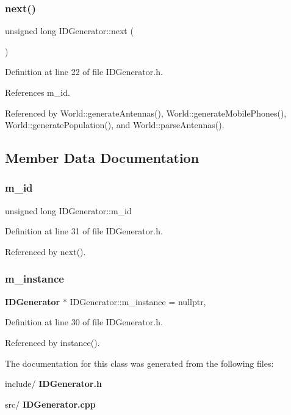 \mbox{\label{class_i_d_generator_a99d8cabb2ec6a17888a8ccbe9c85fee0}} 
\subsubsection{next()}
{\footnotesize\ttfamily unsigned long I\+D\+Generator\+::next (\begin{DoxyParamCaption}{ }\end{DoxyParamCaption})\hspace{0.3cm}{\ttfamily [inline]}}



Definition at line 22 of file I\+D\+Generator.\+h.



References m\+\_\+id.



Referenced by World\+::generate\+Antennas(), World\+::generate\+Mobile\+Phones(), World\+::generate\+Population(), and World\+::parse\+Antennas().



\subsection{Member Data Documentation}
\mbox{\label{class_i_d_generator_ad0400380525f694b23ff675f4f170893}} 
\subsubsection{m\_id}
{\footnotesize\ttfamily unsigned long I\+D\+Generator\+::m\+\_\+id\hspace{0.3cm}{\ttfamily [private]}}



Definition at line 31 of file I\+D\+Generator.\+h.



Referenced by next().

\mbox{\label{class_i_d_generator_a8e96b71a6ddef5c9a2919d0338c00b16}} 
\subsubsection{m\_instance}
{\footnotesize\ttfamily \textbf{ I\+D\+Generator} $\ast$ I\+D\+Generator\+::m\+\_\+instance = nullptr\hspace{0.3cm}{\ttfamily [static]}, {\ttfamily [private]}}



Definition at line 30 of file I\+D\+Generator.\+h.



Referenced by instance().



The documentation for this class was generated from the following files\+:\begin{DoxyCompactItemize}
\item 
include/\textbf{ I\+D\+Generator.\+h}\item 
src/\textbf{ I\+D\+Generator.\+cpp}\end{DoxyCompactItemize}
